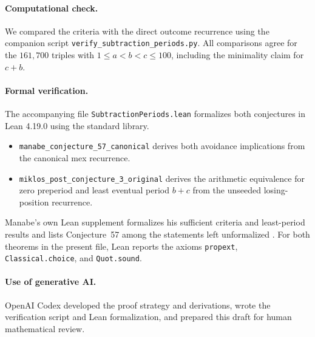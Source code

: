 \documentclass[11pt]{article}
\begin{document}
\paragraph{Computational check.}
We compared the criteria with the direct outcome recurrence using
the companion script \texttt{verify\_subtraction\_periods.py}.
All comparisons agree for the $161{,}700$ triples with
$1\le a<b<c\le100$, including the minimality claim for $c+b$.

\paragraph{Formal verification.}
The accompanying file \texttt{SubtractionPeriods.lean} formalizes both
conjectures in Lean 4.19.0 using the standard library.
\begin{itemize}
 \setlength{\itemsep}{0pt}
 \item \texttt{manabe\_conjecture\_57\_canonical} derives both avoidance
 implications from the canonical mex recurrence.
 \item \texttt{miklos\_post\_conjecture\_3\_original} derives the
 arithmetic equivalence for zero preperiod and least eventual period
 $b+c$ from the unseeded losing-position recurrence.
\end{itemize}
Manabe's own Lean supplement
formalizes his sufficient criteria and least-period results and lists
Conjecture~57 among the statements left unformalized
\cite{manabe-lean}. For both theorems in the present file, Lean reports
the axioms \texttt{propext}, \texttt{Classical.choice}, and \texttt{Quot.sound}.

\paragraph{Use of generative AI.}
OpenAI Codex developed the proof strategy and derivations, wrote the
verification script and Lean formalization, and prepared this draft
for human mathematical review.
\end{document}
